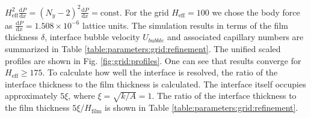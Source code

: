 \documentclass{CFD2011}
\begin{document}
$H_{\mathrm{eff}}^2\frac{\mathrm{d}P}{\mathrm{d}x}=(N_y-2)^2\frac{\mathrm{d}P}{\mathrm{d}
x } = \mathrm{const}$. For the grid $H_{\mathrm{eff}}=100$ we chose the body force as
$\frac{\mathrm{d}P}{\mathrm{d}x}=1.508 \times 10^{-6}$ lattice units.
The
simulation results in terms of the film thickness $\delta$, interface bubble
velocity $U_{bubble}$ and associated capillary numbers are summarized in Table
\ref{table:parameters:grid:refinement}. 
The unified scaled profiles are shown in Fig. \ref{fig:grid:profiles}. One can
see that results converge for $H_{\mathrm{eff}}\geq 175$. To calculate how well the interface is
resolved, the ratio of the interface thickness to the film thickness is calculated. The
interface itself occupies approximately $5 \xi$, where
$\xi=\sqrt{k/A}=1$. The ratio of the interface thickness to the film thickness
$5\xi/H_{\mathrm{film}}$ is shown in Table \ref{table:parameters:grid:refinement}.
\end{document}
